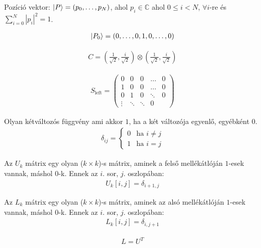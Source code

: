 Pozíció vektor: $\ket{P} =  (p_{0}, \dots, p_{N})$, ahol
$p_{i}\in\mathds{C}$ ahol $0 \leq{} i < N$, $\forall{}i$-re és $\sum\limits_{i=0}^{N} |p_i|^2 = 1$.

\begin{align}
  \ket{P_{0}} =  (0, \dots, 0, 1, 0, \dots, 0)
\end{align}

\begin{align}
  C = (\frac{1}{\sqrt{2}}, \frac{i}{\sqrt{2}}) \otimes (\frac{1}{\sqrt{2}}, \frac{i}{\sqrt{2}})
\end{align}

\begin{align}
  S_{\text{left}} =
  \begin{pmatrix}
    0      & 0      & 0      & \dots  & 0 \\
    1      & 0      & 0      & \dots  & 0 \\
    0      & 1      & 0      & \ddots & 0 \\
    \vdots & \ddots & \ddots & 0
  \end{pmatrix}
\end{align}

\begin{definition}
  Olyan kétváltozós függvény ami akkor $1$, ha a két változója egyenlő, egyébként $0$.
  \begin{align}
    \delta_{ij} =
    \begin{cases}
      0 & \text{ha $i\neq{}j$} \\
      1 & \text{ha $i=j$}
    \end{cases}
  \end{align}
\end{definition}

\begin{definition}
  Az $U_{k}$ mátrix egy olyan ($k\times{}k$)-s mátrix, aminek a felső mellékátlóján
  $1$-esek vannak, máshol $0$-k. Ennek az $i$. sor, $j$. oszlopában:
  \begin{align}
    U_{k}[i,j] = \delta_{i+1,j}
  \end{align}
\end{definition}

\begin{definition}
  Az $L_{k}$ mátrix egy olyan ($k\times{}k$)-s mátrix, aminek az alsó mellékátlóján
  $1$-esek vannak, máshol $0$-k. Ennek az $i$. sor, $j$. oszlopában:
  \begin{align}
    L_{k}[i,j] = \delta_{i,j+1}
  \end{align}
\end{definition}

\begin{align}
  L = U^{T}
\end{align}


